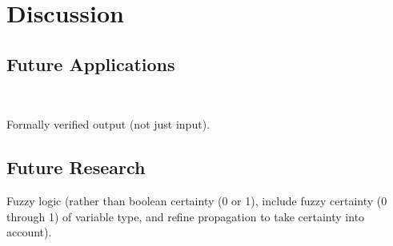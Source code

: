 
\section{Discussion}


\subsection{Future Applications}

 \\

Formally verified output (not just input).

\subsection{Future Research}


Fuzzy logic (rather than boolean certainty (0 or 1), include fuzzy certainty (0 through 1) of variable type, and refine propagation to take certainty into account).
